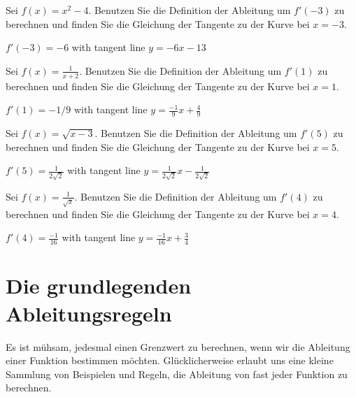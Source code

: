 \begin{exercises}
\break

\begin{exercise}
Sei $f(x) = x^2 -4$. Benutzen Sie die Definition der Ableitung um
$f'(-3)$ zu berechnen und finden Sie die Gleichung der Tangente zu der Kurve bei
$x=-3$.
\begin{answer}
$f'(-3) = -6$ with tangent line $y = -6x -13$
\end{answer}
\end{exercise}

\begin{exercise}
Sei $f(x) = \frac{1}{x+2}$. Benutzen Sie die Definition der Ableitung um
$f'(1)$ zu berechnen und finden Sie die Gleichung der Tangente zu der Kurve bei
$x=1$.
\begin{answer}
$f'(1) = -1/9$ with tangent line $y = \frac{-1}{9}x + \frac{4}{9}$
\end{answer}
\end{exercise}

\begin{exercise}
Sei $f(x) = \sqrt{x-3}$. Benutzen Sie die Definition der Ableitung um
$f'(5)$ zu berechnen und finden Sie die Gleichung der Tangente zu der Kurve bei
$x=5$.
\begin{answer}
$f'(5) = \frac{1}{2\sqrt{2}}$ with tangent line $y = \frac{1}{2\sqrt{2}}x -\frac{1}{2\sqrt{2}}$
\end{answer}
\end{exercise}

\begin{exercise}
Sei $f(x) = \frac{1}{\sqrt{x}}$. Benutzen Sie die Definition der Ableitung um $f'(4)$ zu berechnen und finden Sie die Gleichung der Tangente zu der Kurve bei $x=4$.
\begin{answer}
$f'(4) = \frac{-1}{16}$ with tangent line $y = \frac{-1}{16}x +\frac{3}{4}$
\end{answer}
\end{exercise}

\end{exercises}




\section{Die grundlegenden Ableitungsregeln}


Es ist mühsam, jedesmal einen Grenzwert zu berechnen, wenn wir die Ableitung einer Funktion bestimmen möchten. Glücklicherweise erlaubt uns eine kleine Sammlung von Beispielen und Regeln, die Ableitung von fast jeder Funktion zu berechnen.


